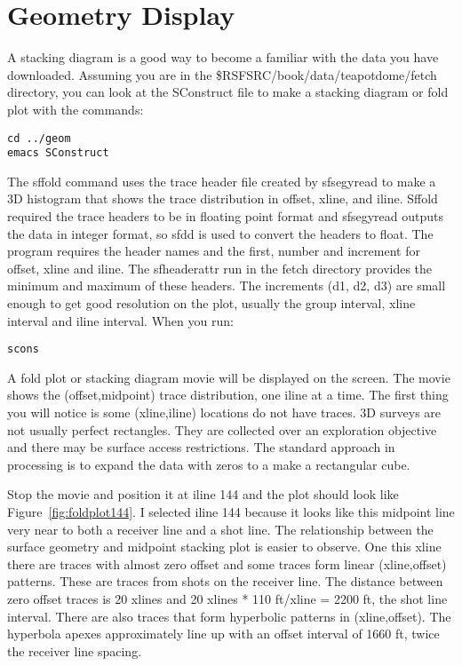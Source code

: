 \section{Geometry Display}
A stacking diagram is a good way to become a familiar with the data you have downloaded.  Assuming you are in the \$RSFSRC/book/data/teapotdome/fetch directory, you can look at the SConstruct file to make a stacking diagram or fold plot with the commands:
\begin{verbatim}  
cd ../geom
emacs SConstruct
\end{verbatim}  
 
The sffold command uses the trace header file created by sfsegyread to make a 3D histogram that shows the trace distribution in offset, xline, and iline.  Sffold required the trace headers to be in floating point format and sfsegyread outputs the data in integer format, so sfdd is used to convert the headers to float.  The program requires the header names and the first, number and increment for offset, xline and iline.  The sfheaderattr run in the fetch directory provides the minimum and maximum of these headers.  The increments (d1, d2, d3) are small enough to get good resolution on the plot, usually the group interval, xline interval and iline interval.  When you run:
\begin{verbatim}  
scons
\end{verbatim}  

A fold plot or stacking diagram movie will be displayed on the screen.  The movie shows the (offset,midpoint) trace distribution, one iline at a time. The first thing you will notice is some (xline,iline) locations do not have traces.  3D surveys are not usually perfect rectangles.  They are collected over an exploration objective and there may be surface access restrictions.  The standard approach in processing is to expand the data with zeros to a make a rectangular cube.

Stop the movie and position it at iline 144 and the plot should look like Figure~\ref{fig:foldplot144}.  I selected iline 144 because it looks like this midpoint line very near to both a receiver line and a shot line.   The relationship between the surface geometry and midpoint stacking plot is easier to observe.  One this xline there are traces with almost zero offset and some traces form linear (xline,offset) patterns.  These are traces from shots on the receiver line.  The distance between zero offset traces is 20 xlines and  20 xlines * 110 ft/xline = 2200 ft, the shot line interval.  There are also traces that form hyperbolic patterns in (xline,offset).  The hyperbola apexes approximately line up with an offset interval of 1660 ft, twice the receiver line spacing.

